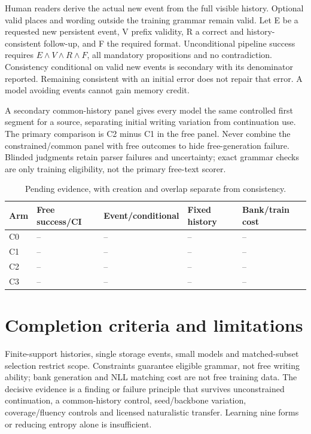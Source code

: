 \documentclass[11pt,a4paper]{article}
\begin{document}
Human readers derive the actual new event from the full visible history.
Optional valid places and wording outside the training grammar remain valid.
Let E be a requested new persistent event, V prefix validity, R a correct and
history-consistent follow-up, and F the required format. Unconditional pipeline
success requires \(E\land V\land R\land F\), all mandatory propositions and
no contradiction. Consistency conditional on valid new events is secondary
with its denominator reported. Remaining consistent with an initial error
does not repair that error. A model avoiding events cannot gain memory credit.

A secondary common-history panel gives every model the same controlled first
segment for a source, separating initial writing variation from continuation
use. The primary comparison is C2 minus C1 in the free panel. Never combine
the constrained/common panel with free outcomes to hide free-generation failure.
Blinded judgments retain parser failures and uncertainty; exact grammar checks
are only training eligibility, not the primary free-text scorer.

\begin{table}[ht]\centering\small
\caption{Pending evidence, with creation and overlap separate from consistency.}
\begin{tabularx}{\linewidth}{lYYYY}\toprule
Arm & Free success/CI & Event/conditional & Fixed history & Bank/train cost\\\midrule
C0 & -- & -- & -- & --\\C1 & -- & -- & -- & --\\
C2 & -- & -- & -- & --\\C3 & -- & -- & -- & --\\
\bottomrule\end{tabularx}\end{table}

\section{Completion criteria and limitations}
Finite-support histories, single storage events, small models and matched-subset
selection restrict scope. Constraints guarantee eligible grammar, not free
writing ability; bank generation and NLL matching cost are not free training
data. The decisive evidence is a finding or failure principle that survives
unconstrained continuation, a common-history control, seed/backbone variation,
coverage/fluency controls and licensed naturalistic transfer. Learning nine
forms or reducing entropy alone is insufficient.
\end{document}
